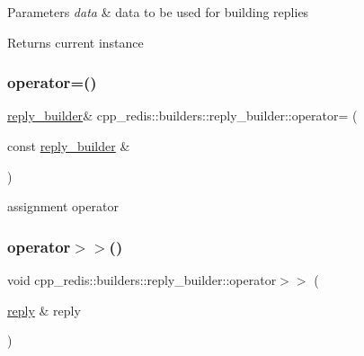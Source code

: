 \begin{DoxyParams}{Parameters}
{\em data} & data to be used for building replies \\
\hline
\end{DoxyParams}
\begin{DoxyReturn}{Returns}
current instance 
\end{DoxyReturn}
\mbox{\label{classcpp__redis_1_1builders_1_1reply__builder_a445ca388e241fe95b522890fee8c14ca}} 
\subsubsection{\texorpdfstring{operator=()}{operator=()}}
{\footnotesize\ttfamily \hyperlink{classcpp__redis_1_1builders_1_1reply__builder}{reply\+\_\+builder}\& cpp\+\_\+redis\+::builders\+::reply\+\_\+builder\+::operator= (\begin{DoxyParamCaption}\item[{const \hyperlink{classcpp__redis_1_1builders_1_1reply__builder}{reply\+\_\+builder} \&}]{ }\end{DoxyParamCaption})\hspace{0.3cm}{\ttfamily [delete]}}



assignment operator 

\mbox{\label{classcpp__redis_1_1builders_1_1reply__builder_a71c0c93754b0bffb9c84c86ac3096bc4}} 
\subsubsection{\texorpdfstring{operator$>$$>$()}{operator>>()}}
{\footnotesize\ttfamily void cpp\+\_\+redis\+::builders\+::reply\+\_\+builder\+::operator$>$$>$ (\begin{DoxyParamCaption}\item[{\hyperlink{classcpp__redis_1_1reply}{reply} \&}]{reply }\end{DoxyParamCaption})}

